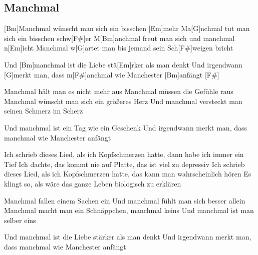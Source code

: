 \subsection*{Manchmal   }
\begin{guitar}

[Bm]Manchmal wünscht man sich ein bisschen [Em]mehr
Ma[G]nchmal tut man sich ein bisschen schw[F#]er
M[Bm]anchmal freut man sich und manchmal n[Em]icht
Manchmal w[G]artet man bis jemand sein Sch[F#]weigen bricht



Und [Bm]manchmal ist die Liebe stä[Em]rker als man denkt
Und irgendwann [G]merkt man, dass m[F#]anchmal wie Manchester [Bm]anfängt [F#] $\;$



Manchmal hält man es nicht mehr aus
Manchmal müssen die Gefühle raus
Manchmal wünscht man sich ein größeres Herz
Und manchmal versteckt man seinen Schmerz im Scherz


Und manchmal ist ein Tag wie ein Geschenk
Und irgendwann merkt man, dass manchmal wie Manchester anfängt


Ich schrieb dieses Lied, als ich Kopfschmerzen hatte, dann habe ich immer ein Tief
Ich dachte, das kommt nie auf Platte, das ist viel zu depressiv
Ich schrieb dieses Lied, als ich Kopfschmerzen hatte, das kann man wahrscheinlich hören
Es klingt so, als wäre das ganze Leben biologisch zu erklären


Manchmal fallen einem Sachen ein
Und manchmal fühlt man sich besser allein
Manchmal macht man ein Schnäppchen, manchmal keins
Und manchmal ist man selber eins


Und manchmal ist die Liebe stärker als man denkt
Und irgendwann merkt man, dass manchmal wie Manchester anfängt
\end{guitar}
